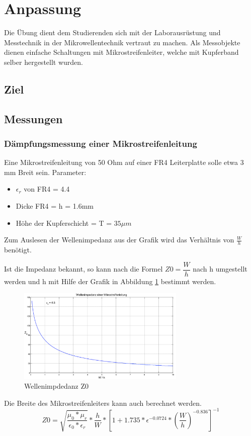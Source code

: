 \section{Anpassung}
Die Übung dient dem Studierenden sich mit der Laborausrüstung und Messtechnik in der Mikrowellentechnik vertraut zu machen. Als Messobjekte dienen einfache Schaltungen mit Mikrostreifenleiter, welche mit Kupferband selber hergestellt wurden.
\subsection{Ziel}
\subsection{Messungen}
\subsubsection{Dämpfungsmessung einer Mikrostreifenleitung}
Eine Mikrostreifenleitung von 50 Ohm auf einer FR4 Leiterplatte solle etwa 3 mm Breit sein.
Parameter:\\
\begin{itemize}
\item $\epsilon_{r}$ von FR4 = 4.4
\item Dicke FR4 = h = 1.6mm
\item Höhe der Kupferschicht = T = $35 \mu m$
\end{itemize}
Zum Auslesen der Wellenimpedanz aus der Grafik wird das Verhältnis von $\frac{W}{h}$ benötigt.

Ist die  Impedanz bekannt, so kann nach die Formel $Z0=\dfrac{W}{h}$ nach h umgestellt werden und h mit Hilfe der Grafik in Abbildung \ref{Z0_Grafik} bestimmt werden.
\begin{figure}[htbp]
	\centering
		\includegraphics[width=8cm]{content/Bilder/Z0_Grafik.png}
	\caption{Wellenimpdedanz Z0}%
	\label{Z0_Grafik}
\end{figure}

Die Breite des Mikrostreifenleiters kann auch berechnet werden.
\[Z0=\sqrt{\dfrac{\mu_{0}*\mu_{r}}{\epsilon_{0}*\epsilon_{r}}}*\frac{h}{W}*\left[1+1.735*\epsilon^{-0.0724}*\left(\dfrac{W}{h}\right)^{-0.836}\right] ^{-1}\]

